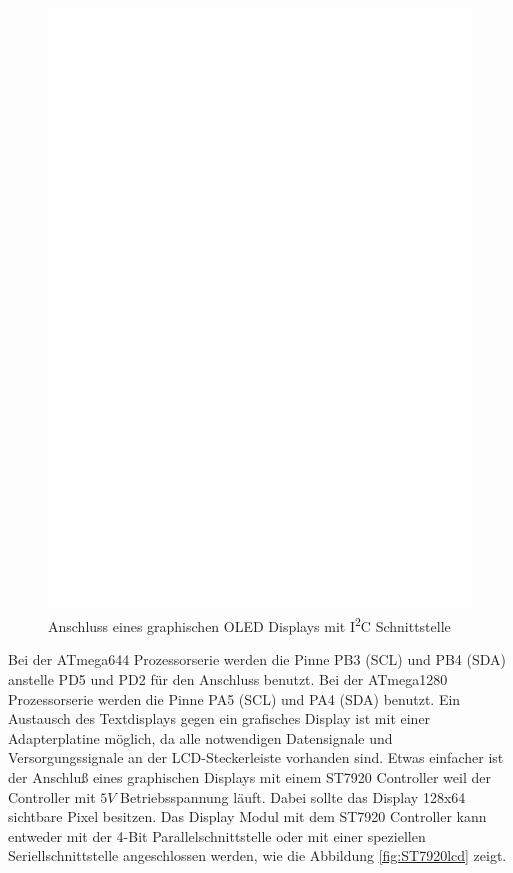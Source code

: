 \begin{figure}[H]
\centering
\includegraphics[width=14cm]{../FIG/SSD1306_I2C.eps}
\caption{Anschluss eines graphischen OLED Displays mit I\textsuperscript{2}C Schnittstelle}
\label{fig:ssd1306i2c}
\end{figure}

Bei der ATmega644 Prozessorserie werden die Pinne PB3 (SCL) und PB4 (SDA) anstelle PD5 und PD2 für den Anschluss benutzt.
Bei der ATmega1280 Prozessorserie werden die Pinne PA5 (SCL) und PA4 (SDA) benutzt.
Ein Austausch des Textdisplays gegen ein grafisches Display ist mit einer Adapterplatine möglich, da
alle notwendigen Datensignale und Versorgungssignale an der LCD-Steckerleiste vorhanden sind.
Etwas einfacher ist der Anschluß eines graphischen Displays mit einem ST7920 Controller weil 
der Controller mit \(5V\) Betriebsspannung läuft.
Dabei sollte das Display 128x64 sichtbare Pixel besitzen.
Das Display Modul mit dem ST7920 Controller kann entweder mit der 4-Bit Parallelschnittstelle oder mit einer 
speziellen Seriellschnittstelle angeschlossen werden, wie die Abbildung \ref{fig:ST7920lcd} zeigt.
 
